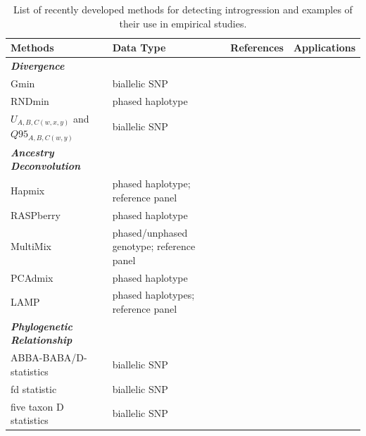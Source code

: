 \documentclass[11pt]{article}
\begin{document}
\begin{table}[h]

\begin{center}
\caption{List of recently developed methods for detecting introgression and examples of their use in empirical studies.} \label{tab:tools}
\begin{tabularx}{\textwidth}{llll}
\\\toprule  
\rowcolor{white}
{\bf Methods}	& {\bf Data Type } &	{\bf References} &  {\bf Applications } \\ \midrule

\rowcolor{gray!25}
{\emph{\bf Divergence}} &   &   &   \\
\rowcolor{gray!25}
Gmin &	biallelic SNP	&  \cite{geneva2015}	 &  \cite{kingan2015}\\
\rowcolor{gray!25}
RNDmin	& phased haplotype	& \cite{rosenzweig2016} &  \cite{roda2017} \\
\rowcolor{gray!25}
$U_{A,B,C(w,x,y)}$ and $Q95_{A,B,C(w,y)}$ & biallelic SNP & \cite{Racimo2015} & \cite{sams2016} \\

\rowcolor{white}
{\emph{\bf Ancestry Deconvolution}} &   &   &   \\
\rowcolor{white}
Hapmix	& phased haplotype; reference panel		& \cite{Price2009}	&  \cite{Hufford2013} \\ 
\rowcolor{white}
RASPberry &	phased haplotype &	\cite{wegmann2011}	 & \cite{christe2016} \\
\rowcolor{white}
MultiMix & phased/unphased genotype; reference panel &	\cite{churchhouse2013} &	\cite{eyheramendy2015} \\
\rowcolor{white}
PCAdmix	 & phased haplotype	 & \cite{brisbin2012pcadmix}	 &  \cite{moreno2014genetics} \\
\rowcolor{white}
LAMP  &	phased haplotypes; reference panel	 & \cite{sankararaman2008}	 & \cite{patterson2012} \\

\rowcolor{gray!25}
{\emph{\bf Phylogenetic Relationship}} &   &   &   \\
\rowcolor{gray!25}
ABBA-BABA/D-statistics	 & biallelic SNP  &	\cite{durand2011}	 &  \cite{heliconius2012} \\
\rowcolor{gray!25}
fd statistic &	biallelic SNP &	\cite{martin2015}  &	\cite{zhang2016genome} \\ 
\rowcolor{gray!25}
five taxon D statistics	& biallelic SNP	&  \cite{pease2015}	& \cite{fontaine2015} \\

\end{tabularx}
\end{center}
\end{table} 
\end{document}
